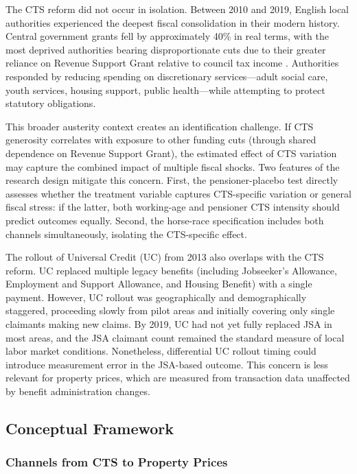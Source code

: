 \documentclass[12pt]{article}
\begin{document}
The CTS reform did not occur in isolation. Between 2010 and 2019, English local authorities experienced the deepest fiscal consolidation in their modern history. Central government grants fell by approximately 40\% in real terms, with the most deprived authorities bearing disproportionate cuts due to their greater reliance on Revenue Support Grant relative to council tax income \citep{innes2020}. Authorities responded by reducing spending on discretionary services---adult social care, youth services, housing support, public health---while attempting to protect statutory obligations.

This broader austerity context creates an identification challenge. If CTS generosity correlates with exposure to other funding cuts (through shared dependence on Revenue Support Grant), the estimated effect of CTS variation may capture the combined impact of multiple fiscal shocks. Two features of the research design mitigate this concern. First, the pensioner-placebo test directly assesses whether the treatment variable captures CTS-specific variation or general fiscal stress: if the latter, both working-age and pensioner CTS intensity should predict outcomes equally. Second, the horse-race specification includes both channels simultaneously, isolating the CTS-specific effect.

The rollout of Universal Credit (UC) from 2013 also overlaps with the CTS reform. UC replaced multiple legacy benefits (including Jobseeker's Allowance, Employment and Support Allowance, and Housing Benefit) with a single payment. However, UC rollout was geographically and demographically staggered, proceeding slowly from pilot areas and initially covering only single claimants making new claims. By 2019, UC had not yet fully replaced JSA in most areas, and the JSA claimant count remained the standard measure of local labor market conditions. Nonetheless, differential UC rollout timing could introduce measurement error in the JSA-based outcome. This concern is less relevant for property prices, which are measured from transaction data unaffected by benefit administration changes.

\subsection{Conceptual Framework}

\subsubsection{Channels from CTS to Property Prices}
\end{document}
